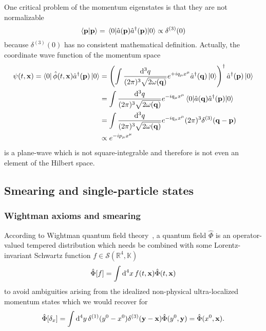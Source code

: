 One critical problem of the momentum eigenstates is that they are not normalizable
\begin{equation}
	\bra{\vb{p}}\ket{\vb{p}}
	=
	\expval{\hat{a}(\vb{p})\hat{a}^\dagger(\vb{p})}{0}
	\propto
	\delta^{(3)}(0)
\end{equation}
because $\delta^{(3)}(0)$ has no consistent mathematical definition.
Actually, the coordinate wave function of the momentum space~\cite[p.~25]{Peskin1995}
\begin{equation}
	\begin{split}
		\psi(t,\vb{x})
		=
		\bra{0}
		\hat\phi(t,\vb{x})
		\hat{a}^\dagger(\vb{p})
		\ket{0}
		&=
		\left(
			\int\frac{\dd[3]{q}}{(2\pi)^3\sqrt{2\omega(\vb{q})}}
			e^{+iq_\mu x^\mu}
			\hat{a}^\dagger(\vb{q})
			\ket{0}
		\right)^\dagger
		\hat{a}^\dagger(\vb{p})
		\ket{0}
		\\
		&=
		\int\frac{\dd[3]{q}}{(2\pi)^3\sqrt{2\omega(\vb{q})}}
		e^{-iq_\mu x^\mu}
		\expval{\hat{a}(\vb{q})\hat{a}^\dagger(\vb{p})}{0}
		\\
		&=
		\int\frac{\dd[3]{q}}{(2\pi)^3\sqrt{2\omega(\vb{q})}}
		e^{-iq_\mu x^\mu}
		(2\pi)^3
		\delta^{(3)}(\vb{q}-\vb{p})
		\\
		&\propto
		e^{-ip_\mu x^\mu}
	\end{split}
\end{equation}
is a plane-wave which is not square-integrable and therefore is not even an element of the Hilbert space.

\subsection{Smearing and single-particle states}

\subsubsection{Wightman axioms and smearing}

According to Wightman quantum field theory~\cite[p.~324]{Bogolubov1989}, a quantum field $\hat\Phi$ is an operator-valued tempered distribution which needs be combined with some Lorentz-invariant Schwartz function $f\in\mathcal{S}(\mathbb{R}^4,\mathbb{K})$
\begin{equation}
	\hat\Phi[f]
	=
	\int\dd[4]{x}
	f(t,\vb{x})
	\hat\Phi(t,\vb{x})
\end{equation}
to avoid ambiguities arising from the idealized non-physical ultra-localized momentum states which we would recover for
\begin{equation}
	\hat\Phi[\delta_x]
	=
	\int\dd[4]{y}
	\delta^{(1)}(y^0-x^0)
	\delta^{(3)}(\vb{y}-\vb{x})
	\hat\Phi(y^0,\vb{y})
	=
	\hat\Phi(x^0,\vb{x})
	.
\end{equation}

